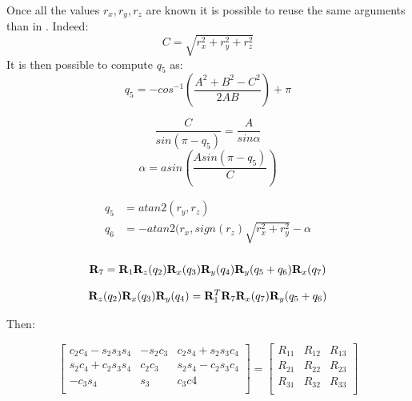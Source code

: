Once all the values ${ r_x, r_y, r_z}$ are known
it is possible to reuse the same arguments than in \cite{Kajita2003}.
Indeed:
\begin{equation*}
C = \sqrt{r_x^2 + r_y^2 + r_z^2}
\end{equation*}
It is then possible to compute $q_5$ as:
\begin{equation*}
q_5 = -cos^{-1}( \frac{A^2 + B^2 - C^2}{2AB}) + \pi
\end{equation*}

\begin{equation*}
\frac{C}{sin(\pi - q_5)}= \frac{A}{sin \alpha}
\end{equation*}
\begin{equation*}
\alpha = asin( \frac{A sin(\pi - q_5)}{C})
\end{equation*}

\begin{equation*}
\begin{aligned}
q_5 &= atan2(r_y,r_z)\\
q_6 &= -atan2(r_x,sign(r_z)\sqrt{r_x^2 + r_y^2} - \alpha\\
\end{aligned}
\end{equation*}


\begin{equation*}
{\bf R}_7 = {\bf R}_1 {\bf R}_z(q_2){\bf R}_x(q_3){\bf R}_y(q_4) {\bf R}_y(q_5+q_6) {\bf R}_x(q_7)
\end{equation*}

\begin{equation*}
{\bf R}_z(q_2) {\bf R}_x(q_3) {\bf R}_y(q_4) = {\bf R}^T_1 {\bf R}_7 {\bf R}_x(q_7) {\bf R}_y (q_5 +q_6)
\end{equation*}

Then:

\begin{equation*}
\left[
\begin{matrix}
c_2 c_4-s_2 s_3 s_4   & -s_2 c_3 & c_2 s_4 + s_2 s_3 c_4 \\
s_2 c_4 + c_2 s_3 s_4 &  c_2 c_3 & s_2 s_4 - c_2 s_3 c_4 \\
-c_3 s_4 & s_3 & c_3 c4\\
\end{matrix}
\right]
=
\left[
\begin{matrix}
R_{11} & R_{12} & R_{13} \\
R_{21} & R_{22} & R_{23} \\
R_{31} & R_{32} & R_{33} \\
\end{matrix}
\right]
\end{equation*}

